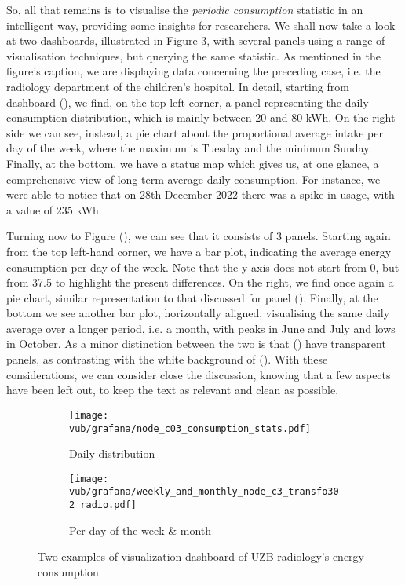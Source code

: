 So, all that remains is to visualise the \textit{periodic consumption} statistic in an intelligent way, providing some insights for researchers.
We shall now take a look at two dashboards, illustrated in Figure \ref{fig:vub_2_dashboard}, with several panels using a range of visualisation techniques, but querying the same statistic.
As mentioned in the figure's caption, we are displaying data concerning the preceding case, i.e. the radiology department of the children's hospital.
In detail, starting from dashboard (), we find, on the top left corner, a panel representing the daily consumption distribution, which is mainly between 20 and 80 kWh. 
On the right side we can see, instead, a pie chart about the proportional average intake per day of the week, where the maximum is Tuesday and the minimum Sunday. 
Finally, at the bottom, we have a status map which gives us, at one glance, a comprehensive view of long-term average daily consumption. 
For instance, we were able to notice that on 28th December 2022 there was a spike in usage, with a value of 235 kWh.

Turning now to Figure (), we can see that it consists of 3 panels. Starting again from the top left-hand corner, 
we have a bar plot, indicating the average energy consumption per day of the week. %
Note that the y-axis does not start from 0, but from 37.5 to highlight the present differences. 
On the right, we find once again a pie chart, similar representation to that discussed for panel ().
Finally, at the bottom we see another bar plot, horizontally aligned, visualising the same daily average over a longer period, i.e. a month, with peaks in June and July and lows in October. 
As a minor distinction between the two is that () have transparent panels, as contrasting with the white background of (). 
With these considerations,  we can consider close the discussion, knowing that a few aspects have been left out, to keep the text as relevant and clean as possible.

\begin{figure}
    \begin{subfigure}{\textwidth}
        \texttt{[image: vub/grafana/node\_c03\_consumption\_stats.pdf]}
        \caption{Daily distribution}
        \label{fig:vub_stats_v1}
    \end{subfigure}
    \begin{subfigure}{\textwidth}
        \texttt{[image: vub/grafana/weekly\_and\_monthly\_node\_c3\_transfo302\_radio.pdf]}
        \caption{Per day of the week \& month}
        \label{fig:vub_stats_v2}
    \end{subfigure}
    \caption{Two examples of visualization dashboard of \ac{UZB} radiology's energy consumption}
    \label{fig:vub_2_dashboard}
\end{figure}

